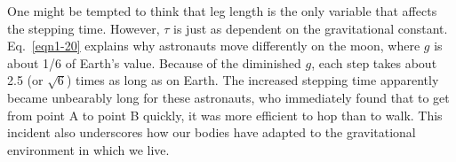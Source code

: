 One might be tempted to think that leg length is the only variable that affects the stepping time.  However, $\tau$ is just as dependent on the gravitational constant.  Eq.~\ref{eqn1-20} explains why astronauts move differently on the moon, where $g$ is about 1/6 of Earth’s value.  Because of the diminished $g$, each step takes about 2.5 (or $\sqrt{6}$) times as long as on Earth. The increased stepping time apparently became unbearably long for these astronauts, who immediately found that to get from point A to point B quickly, it was more efficient to hop than to walk.  This incident also underscores how our bodies have adapted to the gravitational environment in which we live.